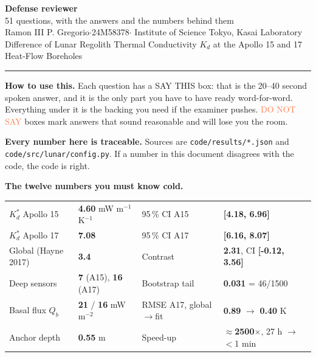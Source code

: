 \documentclass[11pt,a4paper]{article}
\newcommand{\num}[1]{\textbf{#1}}
\begin{document}
\thispagestyle{empty}
\begin{center}
{\Huge\bfseries Defense reviewer}\\[6pt]
{\large 51 questions, with the answers and the numbers behind them}\\[16pt]
{\color{dim}Ramon III P. Gregorio\quad$\cdot$\quad 24M58378\quad$\cdot$\quad
Institute of Science Tokyo, Kasai Laboratory}\\[4pt]
{\color{dim}\small Difference of Lunar Regolith Thermal Conductivity $K_d$ at the
Apollo 15 and 17 Heat-Flow Boreholes}
\end{center}

\vspace{10pt}
\hrule
\vspace{10pt}

\textbf{How to use this.} Each question has a \textcolor{forest}{SAY THIS} box:
that is the 20--40 second spoken answer, and it is the only part you have to
have ready word-for-word. Everything under it is the backing you need if the
examiner pushes. \textcolor{coral}{DO NOT SAY} boxes mark answers that sound
reasonable and will lose you the room.

\textbf{Every number here is traceable.} Sources are
\texttt{code/results/*.json} and \texttt{code/src/lunar/config.py}. If a number
in this document disagrees with the code, the code is right.

\vspace{6pt}
\begin{tcolorbox}[colback=tint,colframe=grid,boxrule=0.8pt,arc=2pt]
{\bfseries The twelve numbers you must know cold.}\par\vspace{4pt}
\small
\begin{tabular}{@{}ll@{\hskip 24pt}ll@{}}
$K_d^{*}$ Apollo 15 & \num{4.60} mW m$^{-1}$ K$^{-1}$ &
  95\,\% CI A15 & \num{[4.18, 6.96]} \\
$K_d^{*}$ Apollo 17 & \num{7.08} &
  95\,\% CI A17 & \num{[6.16, 8.07]} \\
Global (Hayne 2017) & \num{3.4} &
  Contrast & \num{2.31}, CI \num{[-0.12, 3.56]} \\
Deep sensors & \num{7} (A15), \num{16} (A17) &
  Bootstrap tail & \num{0.031} = 46/1500 \\
Basal flux $Q_b$ & \num{21} / \num{16} mW m$^{-2}$ &
  RMSE A17, global$\to$fit & \num{0.89} $\to$ \num{0.40} K \\
Anchor depth & \num{0.55} m &
  Speed-up & $\approx$\num{2500}$\times$, 27 h $\to$ $<$1 min \\
\end{tabular}
\end{tcolorbox}
\end{document}
